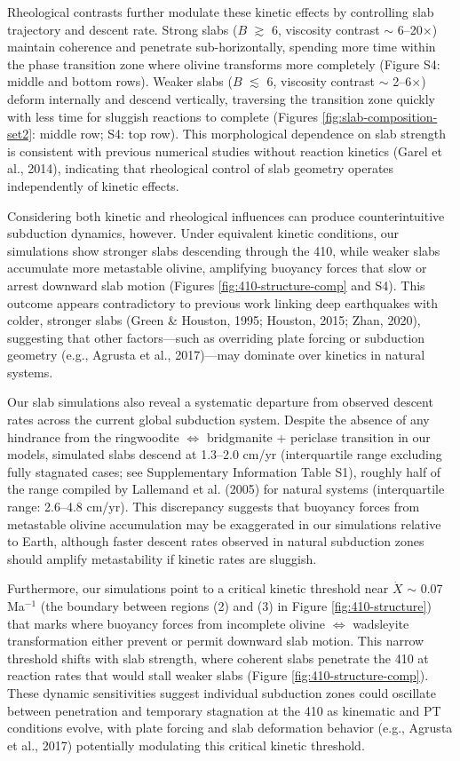 \documentclass[draft,linenumbers]{agujournal2019}
\begin{document}
Rheological contrasts further modulate these kinetic effects by
controlling slab trajectory and descent rate. Strong slabs (\(B\)
\(\gtrsim\) 6, viscosity contrast \(\sim\) 6--20\(\times\)) maintain
coherence and penetrate sub-horizontally, spending more time within the
phase transition zone where olivine transforms more completely (Figure
S4: middle and bottom rows). Weaker slabs (\(B\) \(\lesssim\) 6,
viscosity contrast \(\sim\) 2--6\(\times\)) deform internally and
descend vertically, traversing the transition zone quickly with less
time for sluggish reactions to complete (Figures
\ref{fig:slab-composition-set2}: middle row; S4: top row). This
morphological dependence on slab strength is consistent with previous
numerical studies without reaction kinetics (Garel et al., 2014),
indicating that rheological control of slab geometry operates
independently of kinetic effects.

Considering both kinetic and rheological influences can produce
counterintuitive subduction dynamics, however. Under equivalent kinetic
conditions, our simulations show stronger slabs descending through the
410, while weaker slabs accumulate more metastable olivine, amplifying
buoyancy forces that slow or arrest downward slab motion (Figures
\ref{fig:410-structure-comp} and S4). This outcome appears contradictory
to previous work linking deep earthquakes with colder, stronger slabs
(Green \& Houston, 1995; Houston, 2015; Zhan, 2020), suggesting that
other factors---such as overriding plate forcing or subduction geometry
(e.g., Agrusta et al., 2017)---may dominate over kinetics in natural
systems.

Our slab simulations also reveal a systematic departure from observed
descent rates across the current global subduction system. Despite the
absence of any hindrance from the ringwoodite \(\Leftrightarrow\)
bridgmanite + periclase transition in our models, simulated slabs
descend at 1.3--2.0 cm/yr (interquartile range excluding fully stagnated
cases; see Supplementary Information Table S1), roughly half of the
range compiled by Lallemand et al. (2005) for natural systems
(interquartile range: 2.6--4.8 cm/yr). This discrepancy suggests that
buoyancy forces from metastable olivine accumulation may be exaggerated
in our simulations relative to Earth, although faster descent rates
observed in natural subduction zones should amplify metastability if
kinetic rates are sluggish.

Furthermore, our simulations point to a critical kinetic threshold near
\(\dot{X}\) \(\sim\) 0.07 Ma\(^{-1}\) (the boundary between regions (2)
and (3) in Figure \ref{fig:410-structure}) that marks where buoyancy
forces from incomplete olivine \(\Leftrightarrow\) wadsleyite
transformation either prevent or permit downward slab motion. This
narrow threshold shifts with slab strength, where coherent slabs
penetrate the 410 at reaction rates that would stall weaker slabs
(Figure \ref{fig:410-structure-comp}). These dynamic sensitivities
suggest individual subduction zones could oscillate between penetration
and temporary stagnation at the 410 as kinematic and PT conditions
evolve, with plate forcing and slab deformation behavior (e.g., Agrusta
et al., 2017) potentially modulating this critical kinetic threshold.
\end{document}
